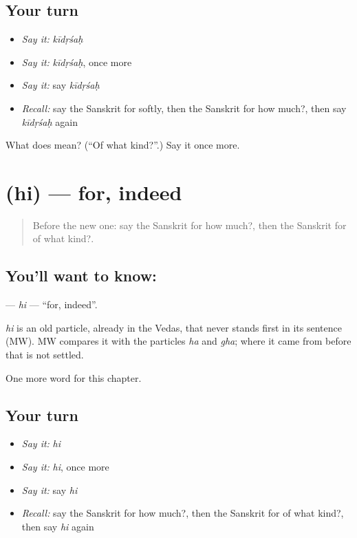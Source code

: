 \subsection*{Your turn}
\begin{itemize}
\raggedright
  \item \emph{Say it:} \emph{kīdṛśaḥ}
  \item \emph{Say it:} \emph{kīdṛśaḥ}, once more
  \item \emph{Say it:} say \emph{kīdṛśaḥ}
  \item \emph{Recall:} say the Sanskrit for softly, then the Sanskrit for how much?, then say \emph{kīdṛśaḥ} again
\end{itemize}

\begin{tcolorbox}[breakable,colback=teal!4,colframe=teal!35!black,title={Before you move on}]
What does  mean? (\textquotedblleft{}Of what kind?\textquotedblright{}.) Say it once more.
\end{tcolorbox}
\section[\texorpdfstring{\sk{हि} (hi)}{हि (hi)}]{ (hi) — for, indeed}

\label{lesson:SA-C185-hi}



\begin{quote}
Before the new one: say the Sanskrit for how much?, then the Sanskrit for of what kind?.
\end{quote}

\subsection*{You'll want to know: }
\textbf{} — \emph{hi} — \textquotedblleft{}for, indeed\textquotedblright{}.

\begin{cousinweb}
\emph{hi} is an old particle, already in the Vedas, that never stands first in its sentence (MW). MW compares it with the particles \emph{ha} and \emph{gha}; where it came from before that is not settled.
\end{cousinweb}

\begin{grammarlens}[title={What you've built}]
One more word for this chapter.
\end{grammarlens}

\subsection*{Your turn}
\begin{itemize}
\raggedright
  \item \emph{Say it:} \emph{hi}
  \item \emph{Say it:} \emph{hi}, once more
  \item \emph{Say it:} say \emph{hi}
  \item \emph{Recall:} say the Sanskrit for how much?, then the Sanskrit for of what kind?, then say \emph{hi} again
\end{itemize}

